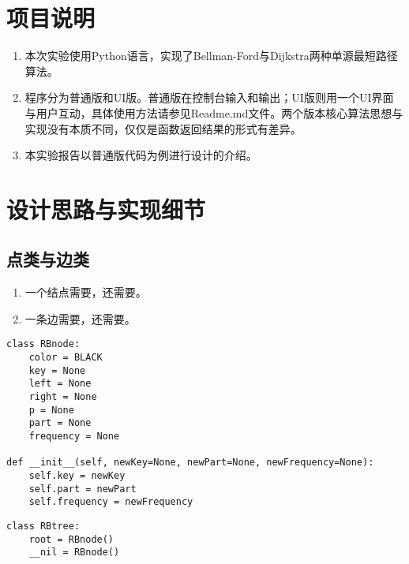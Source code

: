 \documentclass[12pt,letterpaper]{article}
\begin{document}
	\section{项目说明}
\begin{enumerate}
	\item 本次实验使用Python语言，实现了Bellman-Ford与Dijkstra两种单源最短路径算法。
	\item 程序分为普通版和UI版。普通版在控制台输入和输出；UI版则用一个UI界面与用户互动，具体使用方法请参见Readme.md文件。两个版本核心算法思想与实现没有本质不同，仅仅是函数返回结果的形式有差异。
	\item 本实验报告以普通版代码为例进行设计的介绍。
\end{enumerate}	
\section{设计思路与实现细节}
\subsection{点类与边类}
\begin{enumerate}
	\item 一个结点需要，还需要。
	\item 一条边需要，还需要。
\end{enumerate}
\begin{lstlisting}[style = Python]
class RBnode:
	color = BLACK
	key = None
	left = None
	right = None
	p = None
	part = None
	frequency = None

def __init__(self, newKey=None, newPart=None, newFrequency=None):
	self.key = newKey
	self.part = newPart
	self.frequency = newFrequency
\end{lstlisting}
\begin{lstlisting}[style = Python]
class RBtree:
    root = RBnode()
    __nil = RBnode()
\end{lstlisting}
\end{document}

